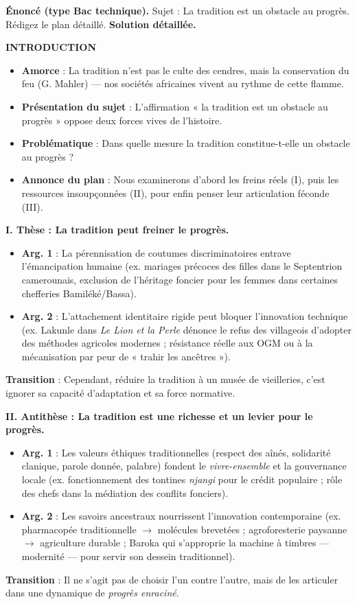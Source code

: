 \documentclass[11pt]{article}
\begin{document}
\begin{exoresolu}
\textbf{Énoncé (type Bac technique).} Sujet : \og La tradition est un obstacle au progrès. \fg{} Rédigez le plan détaillé.
\tcblower
\textbf{Solution détaillée.}

\textbf{INTRODUCTION}
\begin{itemize}
\item \textbf{Amorce} : \og La tradition n'est pas le culte des cendres, mais la conservation du feu \fg{} (G. Mahler) — nos sociétés africaines vivent au rythme de cette flamme.
\item \textbf{Présentation du sujet} : L'affirmation « la tradition est un obstacle au progrès » oppose deux forces vives de l'histoire.
\item \textbf{Problématique} : \og Dans quelle mesure la tradition constitue-t-elle un obstacle au progrès ? \fg{}
\item \textbf{Annonce du plan} : Nous examinerons d'abord les freins réels (I), puis les ressources insoupçonnées (II), pour enfin penser leur articulation féconde (III).
\end{itemize}

\textbf{I. Thèse : La tradition peut freiner le progrès.}
\begin{itemize}
\item \textbf{Arg. 1} : La pérennisation de coutumes discriminatoires entrave l'émancipation humaine (ex. mariages précoces des filles dans le Septentrion camerounais, exclusion de l'héritage foncier pour les femmes dans certaines chefferies Bamiléké/Bassa).
\item \textbf{Arg. 2} : L'attachement identitaire rigide peut bloquer l'innovation technique (ex. Lakunle dans \emph{Le Lion et la Perle} dénonce le refus des villageois d'adopter des méthodes agricoles modernes ; résistance réelle aux OGM ou à la mécanisation par peur de « trahir les ancêtres »).
\end{itemize}
\textbf{Transition} : \og Cependant, réduire la tradition à un musée de vieilleries, c'est ignorer sa capacité d'adaptation et sa force normative. \fg{}

\textbf{II. Antithèse : La tradition est une richesse et un levier pour le progrès.}
\begin{itemize}
\item \textbf{Arg. 1} : Les valeurs éthiques traditionnelles (respect des aînés, solidarité clanique, parole donnée, palabre) fondent le \emph{vivre-ensemble} et la gouvernance locale (ex. fonctionnement des tontines \emph{njangi} pour le crédit populaire ; rôle des chefs dans la médiation des conflits fonciers).
\item \textbf{Arg. 2} : Les savoirs ancestraux nourrissent l'innovation contemporaine (ex. pharmacopée traditionnelle $\rightarrow$ molécules brevetées ; agroforesterie paysanne $\rightarrow$ agriculture durable ; Baroka qui s'approprie la machine à timbres — modernité — pour servir son dessein traditionnel).
\end{itemize}
\textbf{Transition} : \og Il ne s'agit pas de choisir l'un contre l'autre, mais de les articuler dans une dynamique de \emph{progrès enraciné}. \fg{}


\end{exoresolu}
\end{document}

